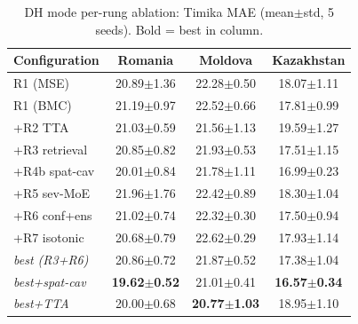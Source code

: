 \begin{table}[t]
\centering\small
\caption{DH mode per-rung ablation: Timika MAE (mean$\pm$std, 5 seeds). Bold = best in column.}
\label{tab:abl_a2}
\setlength{\tabcolsep}{4pt}
\begin{tabular}{l c c c}
\toprule
Configuration & Romania & Moldova & Kazakhstan \\
\midrule
R1 (MSE) & 20.89$\pm$1.36 & 22.28$\pm$0.50 & 18.07$\pm$1.11 \\
R1 (BMC) & 21.19$\pm$0.97 & 22.52$\pm$0.66 & 17.81$\pm$0.99 \\
+R2 TTA & 21.03$\pm$0.59 & 21.56$\pm$1.13 & 19.59$\pm$1.27 \\
+R3 retrieval & 20.85$\pm$0.82 & 21.93$\pm$0.53 & 17.51$\pm$1.15 \\
+R4b spat-cav & 20.01$\pm$0.84 & 21.78$\pm$1.11 & 16.99$\pm$0.23 \\
+R5 sev-MoE & 21.96$\pm$1.76 & 22.42$\pm$0.89 & 18.30$\pm$1.04 \\
+R6 conf+ens & 21.02$\pm$0.74 & 22.32$\pm$0.30 & 17.50$\pm$0.94 \\
+R7 isotonic & 20.68$\pm$0.79 & 22.62$\pm$0.29 & 17.93$\pm$1.14 \\
\textit{best (R3+R6)} & 20.86$\pm$0.72 & 21.87$\pm$0.52 & 17.38$\pm$1.04 \\
\textit{best+spat-cav} & \textbf{19.62$\pm$0.52} & 21.01$\pm$0.41 & \textbf{16.57$\pm$0.34} \\
\textit{best+TTA} & 20.00$\pm$0.68 & \textbf{20.77$\pm$1.03} & 18.95$\pm$1.10 \\
\bottomrule
\end{tabular}
\end{table}